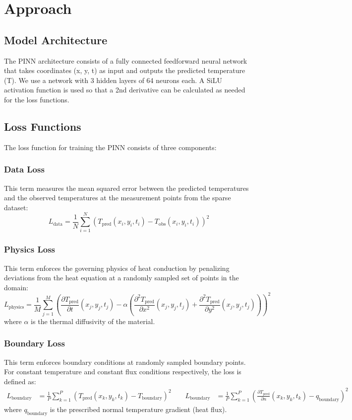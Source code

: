 \documentclass[10pt]{article}
\begin{document}
\section{Approach}
\subsection{Model Architecture}
The PINN architecture consists of a fully connected feedforward neural network that takes coordinates (x, y, t) as input and outputs the predicted temperature (T). We use a network with 3 hidden layers of 64 neurons each. A SiLU activation function is used so that a 2nd derivative can be calculated as needed for the loss functions.

\subsection{Loss Functions}
The loss function for training the PINN consists of three components:
\subsubsection{Data Loss}
This term measures the mean squared error between the predicted temperatures and the observed temperatures at the measurement points from the sparse dataset:
\[L_{\text{data}} = \frac{1}{N} \sum_{i=1}^{N} (T_{\text{pred}}(x_i, y_i, t_i) - T_{\text{obs}}(x_i, y_i, t_i))^2\]

\subsubsection{Physics Loss}
This term enforces the governing physics of heat conduction by penalizing deviations from the heat equation at a randomly sampled set of points in the domain:
\[L_{\text{physics}} = \frac{1}{M} \sum_{j=1}^{M} \left( \frac{\partial T_{\text{pred}}}{\partial t}(x_j, y_j, t_j) - \alpha \left( \frac{\partial^2 T_{\text{pred}}}{\partial x^2}(x_j, y_j, t_j) + \frac{\partial^2 T_{\text{pred}}}{\partial y^2}(x_j, y_j, t_j) \right) \right)^2\]
where \(\alpha\) is the thermal diffusivity of the material.
\subsubsection{Boundary Loss}
This term enforces boundary conditions at randomly sampled boundary points. For constant temperature and constant flux conditions respectively, the loss is defined as:
\[
\begin{aligned}
L_{\text{boundary}} &= \frac{1}{P}\sum_{k=1}^{P}\left(T_{\text{pred}}(x_k,y_k,t_k)-T_{\text{boundary}}\right)^2
\qquad
L_{\text{boundary}} &= \frac{1}{P}\sum_{k=1}^{P}\left(\frac{\partial T_{\text{pred}}}{\partial n}(x_k,y_k,t_k)-q_{\text{boundary}}\right)^2
\end{aligned}
\]
where \(q_{\text{boundary}}\) is the prescribed normal temperature gradient (heat flux).
\end{document}

